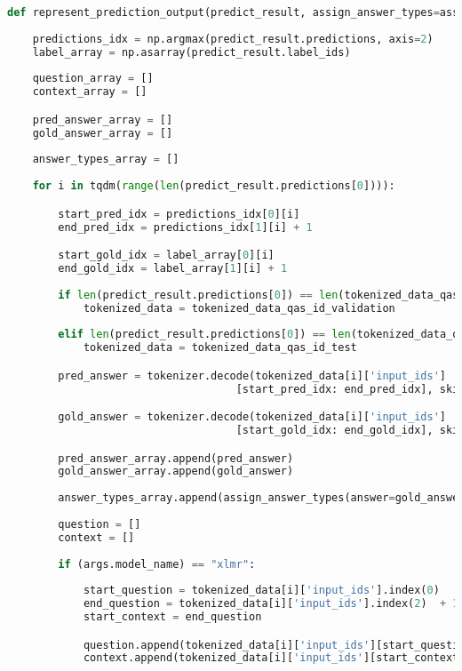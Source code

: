 \begin{lstlisting}[language=Python, caption=Representasi prediksi jawaban untuk evaluasi dan analisis]
def represent_prediction_output(predict_result, assign_answer_types=assign_answer_types):
        
    predictions_idx = np.argmax(predict_result.predictions, axis=2)
    label_array = np.asarray(predict_result.label_ids)
        
    question_array = []
    context_array = []

    pred_answer_array = []
    gold_answer_array = []
    
    answer_types_array = []
    
    for i in tqdm(range(len(predict_result.predictions[0]))):

        start_pred_idx = predictions_idx[0][i]
        end_pred_idx = predictions_idx[1][i] + 1

        start_gold_idx = label_array[0][i]
        end_gold_idx = label_array[1][i] + 1
        
        if len(predict_result.predictions[0]) == len(tokenized_data_qas_id_validation):
            tokenized_data = tokenized_data_qas_id_validation
        
        elif len(predict_result.predictions[0]) == len(tokenized_data_qas_id_test):
            tokenized_data = tokenized_data_qas_id_test

        pred_answer = tokenizer.decode(tokenized_data[i]['input_ids']
                                    [start_pred_idx: end_pred_idx], skip_special_tokens=True)

        gold_answer = tokenizer.decode(tokenized_data[i]['input_ids']
                                    [start_gold_idx: end_gold_idx], skip_special_tokens=True)

        pred_answer_array.append(pred_answer)
        gold_answer_array.append(gold_answer)
        
        answer_types_array.append(assign_answer_types(answer=gold_answer))
        
        question = []
        context = []
        
        if (args.model_name) == "xlmr":
            
            start_question = tokenized_data[i]['input_ids'].index(0)
            end_question = tokenized_data[i]['input_ids'].index(2)  + 1
            start_context = end_question

            question.append(tokenized_data[i]['input_ids'][start_question: end_question])
            context.append(tokenized_data[i]['input_ids'][start_context: ])


\end{lstlisting}
